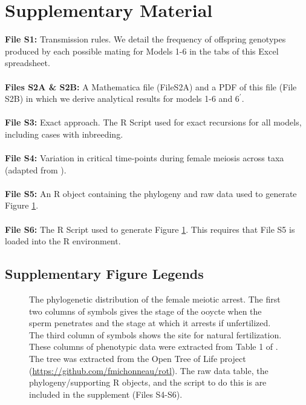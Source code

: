 \documentclass[12pt,letterpaper]{article}
\begin{document}
\clearpage
\newpage
  \setcounter{figure}{0}\global{}

\section*{Supplementary Material}

{\bf{File S1:}} Transmission rules. We detail the frequency of offspring genotypes produced by each possible mating for Models 1-6 in the tabs of this Excel spreadsheet. 
\\ \\
{\bf{Files S2A \& S2B:}} A Mathematica file (FileS2A) and a PDF of this file (File S2B) in which we derive analytical results for models 1-6 and $6^\prime$. 
\\ \\
{\bf{File S3:}} Exact approach. The R Script used for exact recursions for all models, including cases with inbreeding.
\\ \\
{\bf{File S4:}} Variation in critical time-points during female meiosis across taxa (adapted from \citet{Masui_book}).
\\ \\
{\bf{File S5:}} An R object containing the phylogeny and raw data used to generate Figure \ref{Meiotic_fig}.
\\ \\
{\bf{File S6:}} The R Script used to generate Figure \ref{Meiotic_fig}. This requires that File S5 is loaded into the R environment.
\clearpage

\newpage
\subsection*{Supplementary Figure Legends}
\clearpage


\begin{figure}
\caption{The phylogenetic distribution of the female meiotic
  arrest. The first two columns of symbols gives the stage of the ooycte when
  the sperm penetrates and the stage at which it arrests if
  unfertilized. The third column of symbols shows the site for natural fertilization. 
  These columns of phenotypic data were extracted from Table
  1 of \citet{Masui_book}. The tree was extracted from the Open Tree of
Life project (\url{https://github.com/fmichonneau/rotl}). The raw data table, the phylogeny/supporting R objects, and the script to do this is are included in
the supplement (Files S4-S6). }  
\label{Meiotic_fig}
\end{figure}
\end{document}
